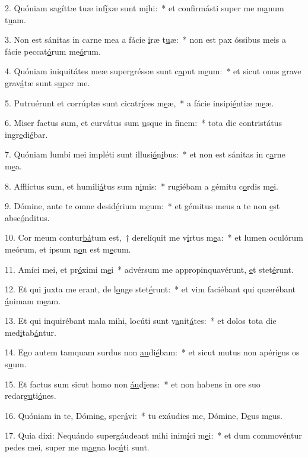 2. Quóniam sagíttæ tuæ inf\uline{í}xæ sunt m\uline{i}hi:~* et confirmásti super me m\uline{a}num t\uline{u}am.\par 
3. Non est sánitas in carne mea a fácie \uline{i}ræ t\uline{u}æ:~* non est pax óssibus meis a fácie peccat\uline{ó}rum me\uline{ó}rum.\par 
4. Quóniam iniquitátes meæ supergréssæ sunt c\uline{a}put m\uline{e}um:~* et sicut onus grave grav\uline{á}tæ sunt s\uline{u}per me.\par 
5. Putruérunt et corrúptæ sunt cicatr\uline{í}ces m\uline{e}æ,~* a fácie insipi\uline{é}ntiæ m\uline{e}æ.\par 
6. Miser factus sum, et curvátus sum \uline{u}sque in f\uline{i}nem:~* tota die contristátus ingr\uline{e}di\uline{é}bar.\par 
7. Quóniam lumbi mei impléti sunt illusi\uline{ó}n\uline{i}bus:~* et non est sánitas in c\uline{a}rne m\uline{e}a.\par 
8. Afflíctus sum, et humili\uline{á}tus sum n\uline{i}mis:~* rugiébam a gémitu c\uline{o}rdis m\uline{e}i.\par 
9. Dómine, ante te omne desid\uline{é}rium m\uline{e}um:~* et gémitus meus a te non \uline{e}st absc\uline{ó}nditus.\par 
10. Cor meum contur\uline{bá}tum est,~† derelíquit me v\uline{i}rtus m\uline{e}a:~* et lumen oculórum meórum, et ipsum n\uline{o}n est m\uline{e}cum.\par 
11. Amíci mei, et pr\uline{ó}ximi m\uline{e}i~* advérsum me appropinquavérunt, \uline{e}t stet\uline{é}runt.\par 
12. Et qui juxta me erant, de l\uline{o}nge stet\uline{é}runt:~* et vim faciébant qui quærébant \uline{á}nimam m\uline{e}am.\par 
13. Et qui inquirébant mala mihi, locúti sunt v\uline{a}nit\uline{á}tes:~* et dolos tota die med\uline{i}tab\uline{á}ntur.\par 
14. Ego autem tamquam surdus non \uline{au}di\uline{é}bam:~* et sicut mutus non apéri\uline{e}ns os s\uline{u}um.\par 
15. Et factus sum sicut homo non \uline{áu}d\uline{i}ens:~* et non habens in ore suo redarg\uline{u}ti\uline{ó}nes.\par 
16. Quóniam in te, Dómin\uline{e}, sper\uline{á}vi:~* tu exáudies me, Dómine, D\uline{e}us m\uline{e}us.\par 
17. Quia dixi: Nequándo supergáudeant mihi inim\uline{í}ci m\uline{e}i:~* et dum commovéntur pedes mei, super me m\uline{a}gna loc\uline{ú}ti sunt.\par 
